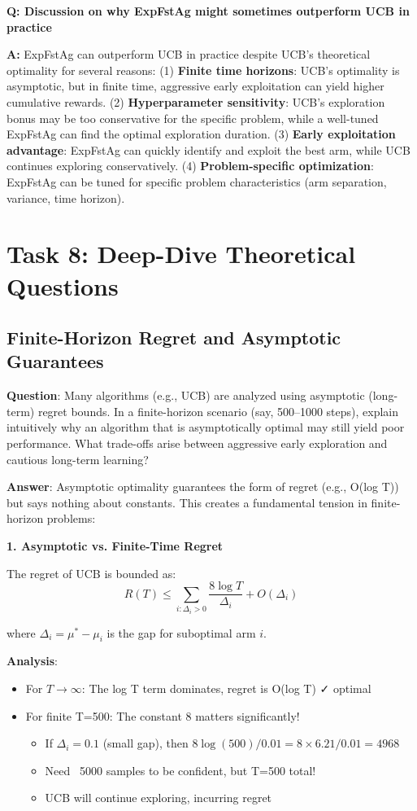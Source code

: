 \documentclass[12pt]{article}
\begin{document}
{{{\textbf{Q: Discussion on why ExpFstAg might sometimes outperform UCB in practice}

\textbf{A:} ExpFstAg can outperform UCB in practice despite UCB's theoretical optimality for several reasons: (1) \textbf{Finite time horizons}: UCB's optimality is asymptotic, but in finite time, aggressive early exploitation can yield higher cumulative rewards. (2) \textbf{Hyperparameter sensitivity}: UCB's exploration bonus may be too conservative for the specific problem, while a well-tuned ExpFstAg can find the optimal exploration duration. (3) \textbf{Early exploitation advantage}: ExpFstAg can quickly identify and exploit the best arm, while UCB continues exploring conservatively. (4) \textbf{Problem-specific optimization}: ExpFstAg can be tuned for specific problem characteristics (arm separation, variance, time horizon).

\section{Task 8: Deep-Dive Theoretical Questions}

\subsection{Finite-Horizon Regret and Asymptotic Guarantees}

\textbf{Question}: Many algorithms (e.g., UCB) are analyzed using asymptotic (long-term) regret bounds. In a finite-horizon scenario (say, 500–1000 steps), explain intuitively why an algorithm that is asymptotically optimal may still yield poor performance. What trade-offs arise between aggressive early exploration and cautious long-term learning?

\textbf{Answer}: Asymptotic optimality guarantees the form of regret (e.g., O(log T)) but says nothing about constants. This creates a fundamental tension in finite-horizon problems:

\textbf{1. Asymptotic vs. Finite-Time Regret}

The regret of UCB is bounded as:
\begin{equation}
R(T) \leq \sum_{i: \Delta_i > 0} \frac{8 \log T}{\Delta_i} + O(\Delta_i)
\end{equation}

where $\Delta_i = \mu^* - \mu_i$ is the gap for suboptimal arm $i$.

\textbf{Analysis}:
\begin{itemize}
\item For $T \to \infty$: The log T term dominates, regret is O(log T) ✓ optimal
\item For finite T=500: The constant 8 matters significantly!
  \begin{itemize}
  \item If $\Delta_i = 0.1$ (small gap), then $8 \log(500) / 0.01 = 8 \times 6.21 / 0.01 = 4968$
  \item Need ~5000 samples to be confident, but T=500 total!
  \item UCB will continue exploring, incurring regret
  \end{itemize}
\end{itemize}

}}}
\end{document}
